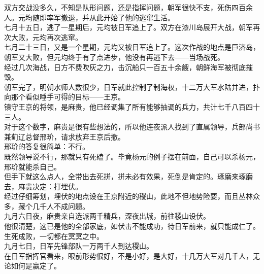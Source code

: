 \begin{multicols}{\theparacolNo}
双方交战没多久，不知是队形问题，还是指挥问题，朝军很快不支，死伤四百余人。元均随即率军撤退，并从此开始了他的逃窜生活。\\

七月十五日，逃了一星期后，元均被日军追上了。双方在漆川岛展开大战，朝军再次大败，元均再次逃窜。\\

七月二十三日，又是一个星期，元均又被日军追上了。这次作战的地点是巨济岛，朝军又大败，但元均终于有了点进步，他没有再逃下去——当场战死。\\

经过几次海战，日方不费吹灰之力，击沉船只一百五十余艘，朝鲜海军被彻底摧毁。\\

朝军完了，明朝水师人数很少，日军就此控制了制海权，十二万大军水陆并进，扑向那个看似唾手可得的目标——王京。\\

镇守王京的将领，是麻贵，他已经调集了所有能够抽调的兵力，共计七千八百四十三人。\\

对于这个数字，麻贵是很有些想法的，所以他连夜派人找到了直属领导，兵部尚书兼蓟辽总督邢玠，请求放弃王京后撤。\\

邢玠的答复很简单：不行。\\

既然领导说不行，那就只有死磕了。毕竟杨元的例子摆在前面，自己可以杀杨元，邢玠就能杀自己。\\

但手下就这么点人，全带出去死拼，拼未必有效果，死倒是肯定的。琢磨来琢磨去，麻贵决定：打埋伏。\\

经过仔细筹划，埋伏的地点设在王京附近的稷山，此地不但地势险要，而且丛林众多，藏个几千人不成问题。\\

九月六日夜，麻贵亲自选派两千精兵，深夜出城，前往稷山设伏。\\

他很清楚，这已是他的全部家底，如伏击不能成功，待日军前来，就只能成仁了。\\

生死成败，一切都在冥冥之中。\\

九月七日，日军先锋部队一万两千人到达稷山。\\

在日军指挥官看来，眼前形势很好，不是小好，是大好，十几万大军对几千人，无论如何是赢定了。\\


\end{multicols}
